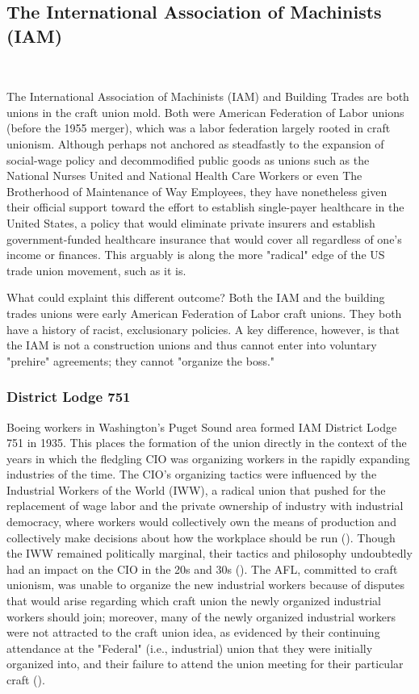 \documentclass[12pt]{article}
\begin{document}
\subsection{The International Association of Machinists (IAM)} \

The International Association of Machinists (IAM) and Building Trades are both unions in the craft union mold. Both were American Federation of Labor unions (before the 1955 merger), which was a labor federation largely rooted in craft unionism. Although perhaps not anchored as steadfastly to the expansion of social-wage policy and decommodified public goods as unions such as the National Nurses United and National Health Care Workers or even The Brotherhood of Maintenance of Way Employees, they have nonetheless given their official support toward the effort to establish single-payer healthcare in the United States, a policy that would eliminate private insurers and establish government-funded healthcare insurance that would cover all regardless of one's income or finances. This arguably is along the more "radical" edge of the US trade union movement, such as it is.

What could explaint this different outcome? Both the IAM and the building trades unions were early American Federation of Labor craft unions. They both have a history of racist, exclusionary policies. A key difference, however, is that the IAM is not a construction unions and thus cannot enter into voluntary "prehire" agreements; they cannot "organize the boss."

\subsubsection{District Lodge 751}
Boeing workers in Washington's Puget Sound area formed IAM District Lodge 751 in 1935. This places the formation of the union directly in the context of the years in which the fledgling CIO was organizing workers in the rapidly expanding industries of the time. The CIO's organizing tactics were influenced by the Industrial Workers of the World (IWW), a radical union that pushed for the replacement of wage labor and the private ownership of industry with industrial democracy, where workers would collectively own the means of production and collectively make decisions about how the workplace should be run (\cite{industrialworkersoftheworldIWW}). Though the IWW remained politically marginal, their tactics and philosophy undoubtedly had an impact on the CIO in the 20s and 30s (\cite[2-6]{mccannBloodWaterHistory1989}). The AFL, committed to craft unionism, was unable to organize the new industrial workers because of disputes that would arise regarding which craft union the newly organized industrial workers should join; moreover, many of the newly organized industrial workers were not attracted to the craft union idea, as evidenced by their continuing attendance at the "Federal" (i.e., industrial) union that they were initially organized into, and their failure to attend the union meeting for their particular craft (\cite[8]{mccannBloodWaterHistory1989}). 
\end{document}
